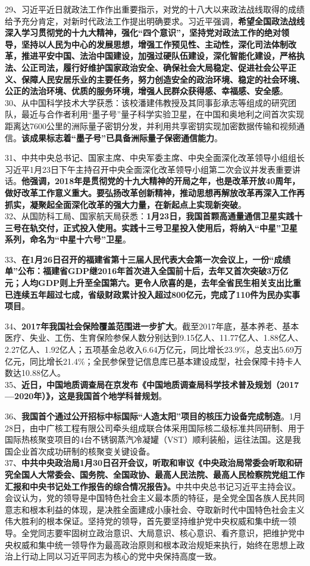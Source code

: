 29、习近平近日就政法工作作出重要指示，对党的十八大以来政法战线取得的成绩给予充分肯定，对新时代政法工作提出明确要求。习近平强调，{\textbf{希望全国政法战线深入学习贯彻党的十九大精神，强化``四个意识''，坚持党对政法工作的绝对领导，坚持以人民为中心的发展思想，增强工作预见性、主动性，深化司法体制改革，推进平安中国、法治中国建设，加强过硬队伍建设，深化智能化建设，严格执法、公正司法，履行好维护国家政治安全、确保社会大局稳定、促进社会公平正义、保障人民安居乐业的主要任务，努力创造安全的政治环境、稳定的社会环境、公正的法治环境、优质的服务环境，增强人民群众获得感、幸福感、安全感}}。\\
30、从中国科学技术大学获悉：该校潘建伟教授及其同事彭承志等组成的研究团队，最近与合作者利用``墨子号''量子科学实验卫星，在中国和奥地利之间首次实现距离达7600公里的洲际量子密钥分发，并利用共享密钥实现加密数据传输和视频通信。{\textbf{该成果标志着``墨子号''已具备洲际量子保密通信能力}}。

31、中共中央总书记、国家主席、中央军委主席、中央全面深化改革领导小组组长习近平1月23日下午主持召开中央全面深化改革领导小组第二次会议并发表重要讲话。{\textbf{他强调，2018年是贯彻党的十九大精神的开局之年，也是改革开放40周年，做好改革工作意义重大。要弘扬改革创新精神，推动思想再解放改革再深入工作再抓实，凝聚起全面深化改革的强大力量，在新起点上实现新突破}}。\\
32、从国防科工局、国家航天局获悉：{\textbf{1月23日，我国首颗高通量通信卫星实践十三号在轨交付，正式投入使用。实践十三号卫星投入使用后，将纳入``中星''卫星系列，命名为``中星十六号''卫星}}。

33、{\textbf{在1月26日召开的福建省第十三届人民代表大会第一次会议上，一份``成绩单''公布：福建省GDP继2016年首次进入全国前十后，去年又首次突破3万亿元；人均GDP则上升至全国第六。更令人欣喜的是，去年全省民生相关支出比重已连续五年超过七成，省级财政累计投入超过800亿元，完成了110件为民办实事项目}}。

34、{\textbf{2017年我国社会保险覆盖范围进一步扩大}}。截至2017年底，基本养老、基本医疗、失业、工伤、生育保险参保人数分别达到9.15亿人、11.77亿人、1.88亿人、2.27亿人、1.92亿人；五项基金总收入6.64万亿元，同比增长23.9\%，总支出5.69万亿元，同比增长21.4\%；全民参保登记信息库已基本建设成型，社会保障卡持卡人数达10.88亿人。\\
35、{\textbf{近日，中国地质调查局在京发布《中国地质调查局科学技术普及规划（2017---2020年）》，这是我国首个地学科普规划}}。

36、{\textbf{我国首个通过公开招标中标国际``人造太阳''项目的核压力设备完成制造}}。1月28日，由中广核工程有限公司牵头组成联合体采用国际核二级标准共同研制、用于国际热核聚变项目的4台不锈钢蒸汽冷凝罐（VST）顺利装船，运往法国。这是我国企业首次成功研制的核聚变关键设备。\\
37、{\textbf{中共中央政治局1月30日召开会议，听取和审议《中央政治局常委会听取和研究全国人大常委会、国务院、全国政协、最高人民法院、最高人民检察院党组工作汇报和中央书记处工作报告的综合情况报告》。}}中共中央总书记习近平主持会议。会议认为，党的领导是中国特色社会主义最本质的特征，是全党全国各族人民共同意志和根本利益的体现，是决胜全面建成小康社会、夺取新时代中国特色社会主义伟大胜利的根本保证。坚持党的领导，首先要坚持维护党中央权威和集中统一领导。全党同志要牢固树立政治意识、大局意识、核心意识、看齐意识，把维护党中央权威和集中统一领导作为最高政治原则和根本政治规矩来执行，始终在思想上政治上行动上同以习近平同志为核心的党中央保持高度一致。
